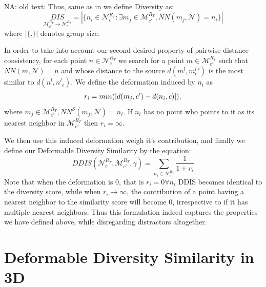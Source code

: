 \documentclass[10pt,twocolumn,letterpaper]{article}
\newcommand{\colornote}[3]{{\color{#1}\bf{#2: #3}\normalfont}}
\newcommand{\colornote}[3]{}
\newcommand {\nadav}[1]{\colornote{red}{NA}{#1}}
\begin{document}
\\
\nadav{old text:
Thus, same as in \cite{talmi2017template} we define Diversity as:
\begin{equation}
\underset{{\mathcal{M}^{R_T}_{c'}}\rightarrow{\mathcal{N}^{R_T}_{c}}}{DIS}=|\{n_i\in{\mathcal{N}^{R_T}_{c}}:\exists m_j\in{\mathcal{M}^{R_T}_{c'}},NN(m_j,\mathcal{N})=n_i\}|
\end{equation}
where $|\{.\}|$ denotes group size. 

In order to take into account our second desired property of pairwise distance consistency, for each point $n\in{\mathcal{N}^{R_T}_{c}}$ we search for a point $m\in{\mathcal{M}^{R_T}_{c'}}$ such that $NN(m,\mathcal{N})=n$ and whose distance to the source $d(m^l,m^l_c')$ is the most similar to $d(n^l,{n^l}_c)$. 
We define the deformation induced by $n_i$ as 
\begin{equation}
r_i = min(|d(m_j,c')-d(n_i,c)|),\\
\end{equation}
where $m_j\in {\mathcal{M}^{R_T}_{c'}}, NN^S(m_j,\mathcal{N})=n_i$. If $n_i$ has no point who points to it as its nearest neighbor in ${\mathcal{M}^{R_T}_{c'}}$ then $r_i=\infty$.

We then use this induced deformation weigh it's contribution, and finally we define our Deformable Diversity Similarity by the equation:
\begin{equation}
DDIS({\mathcal{N}^{R_T}_{c}},{\mathcal{M}^{R_T}_{c'}},\gamma)=\sum_{n_i\in {\mathcal{N}^{R_T}_{c}}}\frac{1}{1+r_i}
\end{equation}
Note that when the deformation is 0, that is $r_i=0 \forall n_i$ DDIS becomes identical to the diversity score, while when $r_i\rightarrow\infty$, the contribution of a point having a nearest neighbor to the similarity score will become 0, irrespective to if it has multiple nearest neighbors. Thus this formulation indeed captures the properties we have defined above, while disregarding distractors altogether.
} 

\section{Deformable Diversity Similarity in 3D}
\end{document}

